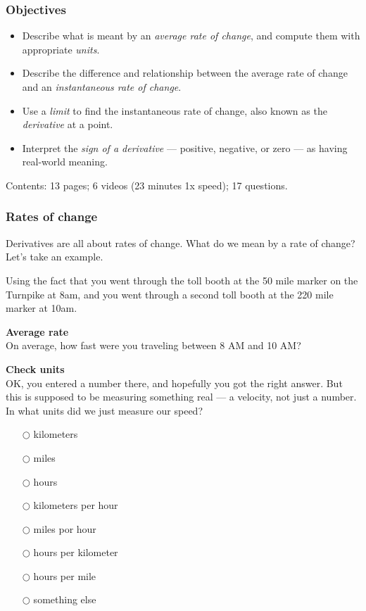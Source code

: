 \documentclass[pdftex, brazil, 12pt, twoside]{article}
\begin{document}
\subsubsection{Objectives}
\label{u1-what-obj}

\begin{itemize}[noitemsep]
\item Describe what is meant by an \emph{average rate of change}, and compute
  them with appropriate \emph{units}.
\item Describe the difference and relationship between the average rate of change
  and an \emph{instantaneous rate of change}.
\item Use a \emph{limit} to find the instantaneous rate of change, also known
  as the \emph{derivative} at a point.
\item Interpret the \emph{sign of a derivative} --- positive, negative, or zero
  --- as having real-world meaning.
\end{itemize}

Contents: 13 pages; 6 videos (23 minutes 1x speed); 17 questions.

\subsubsection{Rates of change}
\label{u1-what-rates-of-change}

Derivatives are all about rates of change. What do we mean by a rate of change?
Let's take an example.

Using the fact that you went through the toll booth at the 50 mile marker on the
Turnpike at 8am, and you went through a second toll booth at the 220 mile marker
at 10am.

\begin{exercise}
  \textbf{Average rate}\\%
  On average, how fast were you traveling between 8 AM and 10 AM?
\end{exercise}

\begin{exercise}
  \textbf{Check units}\\%
  OK, you entered a number there, and hopefully you got
  the right answer. But this is supposed to be measuring something real --- a velocity,
  not just a number. In what units did we just measure our speed?
\begin{itemize}[noitemsep]
\item[$\bigcirc$] kilometers
\item[$\bigcirc$] miles
\item[$\bigcirc$] hours
\item[$\bigcirc$] kilometers per hour
\item[$\bigcirc$] miles por hour
\item[$\bigcirc$] hours per kilometer
\item[$\bigcirc$] hours per mile
\item[$\bigcirc$] something else
\end{itemize}
\end{exercise}
\end{document}
